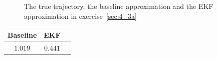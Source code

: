\documentclass[a4paper,oneside,article]{memoir}
\newcommand{\otoprule}{\midrule[\heavyrulewidth]}
\begin{document}
\begin{figure}[htb]
  \begin{adjustwidth}{-2in}{-2in}
	  \centering
  \end{adjustwidth}
  	  \caption{The true trajectory, the baseline approximation and the EKF approximation in exercise~\ref{sec:4_3a}}
	  \label{fig:ex_4_3}
\end{figure}



\begin{table}[h]
	\centering
	\begin{tabular}{c c c}
		\otoprule
		Baseline & EKF\\
		\midrule
		$1.019$ & $0.441$\\
		\bottomrule
	\end{tabular}
	\label{table:rmse4.3}
\end{table}

\clearpage






%
%
\end{document}
